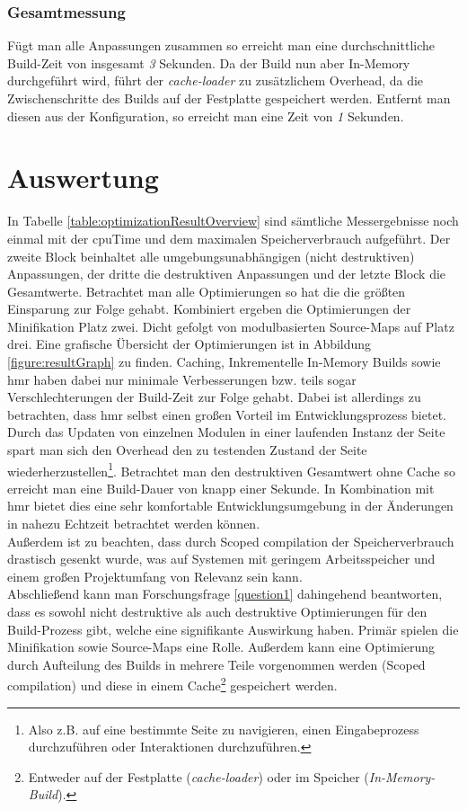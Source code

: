 \documentclass[11pt]{report}
\begin{document}
			\subsection{Gesamtmessung}
				Fügt man alle Anpassungen zusammen so erreicht man eine durchschnittliche Build-Zeit von insgesamt \emph{3} Sekunden. Da der Build nun aber In-Memory durchgeführt wird, führt der \emph{cache-loader} zu zusätzlichem Overhead, da die Zwischenschritte des Builds auf der Festplatte gespeichert werden. Entfernt man diesen aus der Konfiguration, so erreicht man eine Zeit von \emph{1} Sekunden.

	\chapter{Auswertung}
		In Tabelle \ref{table:optimizationResultOverview} sind sämtliche Messergebnisse noch einmal mit der \Gls{cpuTime} und dem maximalen Speicherverbrauch aufgeführt. Der zweite Block beinhaltet alle umgebungsunabhängigen (nicht destruktiven) Anpassungen, der dritte die destruktiven Anpassungen und der letzte Block die Gesamtwerte. Betrachtet man alle Optimierungen so hat die  die größten Einsparung zur Folge gehabt. Kombiniert ergeben die Optimierungen der Minifikation Platz zwei. Dicht gefolgt von modulbasierten Source-Maps auf Platz drei. Eine grafische Übersicht der Optimierungen ist in Abbildung \ref{figure:resultGraph} zu finden. Caching, Inkrementelle In-Memory Builds sowie \Gls{hmr} haben dabei nur minimale Verbesserungen bzw. teils sogar Verschlechterungen der Build-Zeit zur Folge gehabt. Dabei ist allerdings zu betrachten, dass \Gls{hmr} selbst einen großen Vorteil im Entwicklungsprozess bietet. Durch das Updaten von einzelnen Modulen in einer laufenden Instanz der Seite spart man sich den Overhead den zu testenden Zustand der Seite wiederherzustellen\footnote{Also z.B. auf eine bestimmte Seite zu navigieren, einen Eingabeprozess durchzuführen oder Interaktionen durchzuführen.}. Betrachtet man den destruktiven Gesamtwert ohne Cache so erreicht man eine Build-Dauer von knapp einer Sekunde. In Kombination mit \Gls{hmr} bietet dies eine sehr komfortable Entwicklungsumgebung in der Änderungen in nahezu Echtzeit betrachtet werden können.\\
		Außerdem ist zu beachten, dass durch Scoped compilation der Speicherverbrauch drastisch gesenkt wurde, was auf Systemen mit geringem Arbeitsspeicher und einem großen Projektumfang von Relevanz sein kann.\\
		Abschließend kann man Forschungsfrage \ref{question1} dahingehend beantworten, dass es sowohl nicht destruktive als auch destruktive Optimierungen für den Build-Prozess gibt, welche eine signifikante Auswirkung haben. Primär spielen die Minifikation sowie Source-Maps eine Rolle. Außerdem kann eine Optimierung durch Aufteilung des Builds in mehrere Teile vorgenommen werden (Scoped compilation) und diese in einem Cache\footnote{Entweder auf der Festplatte (\emph{cache-loader}) oder im Speicher (\emph{In-Memory-Build}).} gespeichert werden.
		
\end{document}
